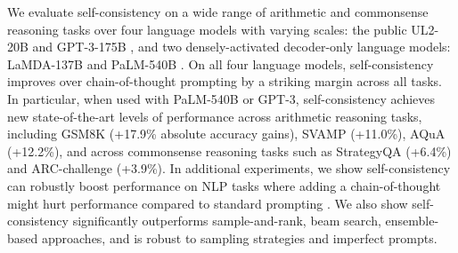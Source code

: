 \documentclass{article} %
\begin{document}
We evaluate self-consistency on a wide range of arithmetic and commonsense reasoning tasks over four language models with varying scales: the public UL2-20B \citep{ul2} and GPT-3-175B \citep{brown2020language}, and two densely-activated decoder-only language models: LaMDA-137B \citep{thoppilan2022lamda} and PaLM-540B \citep{palm}.
On all four language models, self-consistency improves over chain-of-thought prompting by a striking margin across all tasks.
In particular, when used with PaLM-540B or GPT-3, self-consistency achieves new state-of-the-art levels of performance across arithmetic reasoning tasks, including GSM8K \citep{cobbe2021training} (+17.9\% absolute accuracy gains), SVAMP \citep{patel-etal-2021-nlp} (+11.0\%), AQuA \citep{ling-etal-2017-program} (+12.2\%), and across commonsense reasoning tasks such as StrategyQA \citep{geva-etal-2021-aristotle} (+6.4\%) and  ARC-challenge \citep{Clark2018ThinkYH} (+3.9\%).
In additional experiments, we show self-consistency can robustly boost performance on NLP tasks where adding a chain-of-thought might hurt performance compared to standard prompting \citep{ye2022unreliability}.
We also show self-consistency significantly outperforms sample-and-rank, beam search, ensemble-based approaches, and is robust to sampling strategies and imperfect prompts.

\end{document}

